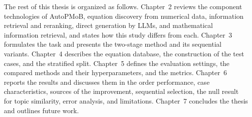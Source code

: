 The rest of this thesis is organized as follows. Chapter~2 reviews the component technologies of
AutoPMoB, equation discovery from numerical data, information retrieval and reranking, direct
generation by LLMs, and mathematical information retrieval, and states how this study differs from
each. Chapter~3 formulates the task and presents the two-stage method and its sequential variants.
Chapter~4 describes the equation database, the construction of the test cases, and the stratified
split. Chapter~5 defines the evaluation settings, the compared methods and their hyperparameters, and the
metrics. Chapter~6 reports the results and discusses them in the order performance, case
characteristics, sources of the improvement, sequential selection, the null result for topic
similarity, error analysis, and limitations. Chapter~7 concludes the thesis and outlines future
work.
